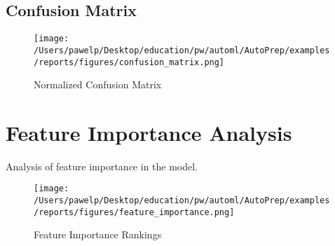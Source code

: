 \documentclass{article}%
\begin{document}
\subsection{Confusion Matrix}%
\label{subsec:ConfusionMatrix}%

%


\begin{figure}[H]%
\centering%
\texttt{[image: /Users/pawelp/Desktop/education/pw/automl/AutoPrep/examples/reports/figures/confusion\_matrix.png]}%
\caption{Normalized Confusion Matrix}%
\end{figure}

%
\section{Feature Importance Analysis}%
\label{sec:FeatureImportanceAnalysis}%
Analysis of feature importance in the model.

%


\begin{figure}[H]%
\centering%
\texttt{[image: /Users/pawelp/Desktop/education/pw/automl/AutoPrep/examples/reports/figures/feature\_importance.png]}%
\caption{Feature Importance Rankings}%
\end{figure}

%
\end{document}
